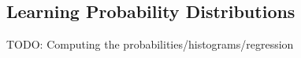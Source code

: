 





\subsection{Learning Probability Distributions}

TODO: Computing the probabilities/histograms/regression